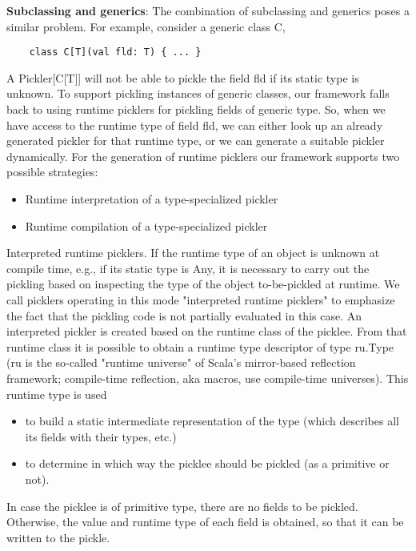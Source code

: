 \documentclass[preprint,10pt]{sigplanconf}
\theoremstyle{definition}
\begin{document}
{\bf Subclassing and generics}: The combination of subclassing and generics poses a similar problem. For example, consider a generic class C,

\begin{verbatim}
    class C[T](val fld: T) { ... }
\end{verbatim}

A Pickler[C[T]] will not be able to pickle the field fld if its static type is unknown. To support pickling instances of generic classes, our framework falls back to using runtime picklers for pickling fields of generic type. So, when we have access to the runtime type of field fld, we can either look up an already generated pickler for that runtime type, or we can generate a suitable pickler dynamically. For the generation of runtime picklers our framework supports two possible strategies:

\begin{itemize}
\item Runtime interpretation of a type-specialized pickler
\item Runtime compilation of a type-specialized pickler
\end{itemize}

Interpreted runtime picklers. If the runtime type of an object is unknown at compile time, e.g., if its static type is Any, it is necessary to carry out the pickling based on inspecting the type of the object to-be-pickled at runtime. We call picklers operating in this mode "interpreted runtime picklers" to emphasize the fact that the pickling code is not partially evaluated in this case. An interpreted pickler is created based on the runtime class of the picklee. From that runtime class it is possible to obtain a runtime type descriptor of type ru.Type (ru is the so-called "runtime universe" of Scala's mirror-based reflection framework; compile-time reflection, aka macros, use compile-time universes). This runtime type is used

\begin{itemize}
\item to build a static intermediate representation of the type (which describes all its fields with their types, etc.)
\item to determine in which way the picklee should be pickled (as a primitive or not).
\end{itemize}

In case the picklee is of primitive type, there are no fields to be pickled. Otherwise, the value and runtime type of each field is obtained, so that it can be written to the pickle.
\end{document}
